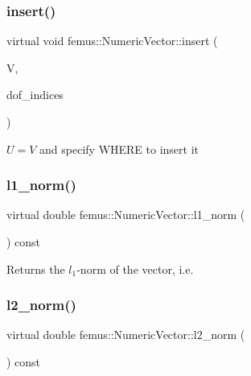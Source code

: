 \subsubsection{\texorpdfstring{insert()}{insert()}\hspace{0.1cm}{\footnotesize\ttfamily [4/4]}}
{\footnotesize\ttfamily virtual void femus\+::\+Numeric\+Vector\+::insert (\begin{DoxyParamCaption}\item[{const \mbox{\hyperlink{classfemus_1_1_dense_sub_vector}{Dense\+Sub\+Vector}} \&}]{V,  }\item[{const std\+::vector$<$ int $>$ \&}]{dof\+\_\+indices }\end{DoxyParamCaption})\hspace{0.3cm}{\ttfamily [pure virtual]}}



$ U=V $ and specify W\+H\+E\+RE to insert it 

\mbox{\label{classfemus_1_1_numeric_vector_acf36fd402fe969244682a009f46d8f8c}} 
\subsubsection{\texorpdfstring{l1\+\_\+norm()}{l1\_norm()}}
{\footnotesize\ttfamily virtual double femus\+::\+Numeric\+Vector\+::l1\+\_\+norm (\begin{DoxyParamCaption}{ }\end{DoxyParamCaption}) const\hspace{0.3cm}{\ttfamily [pure virtual]}}

\begin{DoxyReturn}{Returns}
the $l_1$-\/norm of the vector, i.\+e. 
\end{DoxyReturn}
\mbox{\label{classfemus_1_1_numeric_vector_aa86bfb1f5b0cb1f61dbb564764b44370}} 
\subsubsection{\texorpdfstring{l2\+\_\+norm()}{l2\_norm()}}
{\footnotesize\ttfamily virtual double femus\+::\+Numeric\+Vector\+::l2\+\_\+norm (\begin{DoxyParamCaption}{ }\end{DoxyParamCaption}) const\hspace{0.3cm}{\ttfamily [pure virtual]}}

